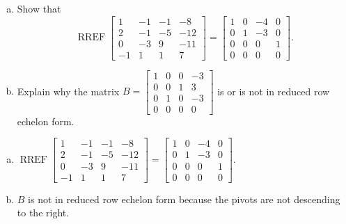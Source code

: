 
\begin{exerciseStatement}

\begin{enumerate}[(a)]
\item Show that \[\operatorname{RREF} \left[\begin{array}{cccc}
1 & -1 & -1 & -8 \\
2 & -1 & -5 & -12 \\
0 & -3 & 9 & -11 \\
-1 & 1 & 1 & 7
\end{array}\right] = \left[\begin{array}{cccc}
1 & 0 & -4 & 0 \\
0 & 1 & -3 & 0 \\
0 & 0 & 0 & 1 \\
0 & 0 & 0 & 0
\end{array}\right] .\]
\item Explain why the matrix \(B= \left[\begin{array}{cccc}
1 & 0 & 0 & -3 \\
0 & 0 & 1 & 3 \\
0 & 1 & 0 & -3 \\
0 & 0 & 0 & 0
\end{array}\right] \) is or is not in reduced row echelon form.
\end{enumerate}
    
\end{exerciseStatement}
    
\begin{exerciseAnswer} 

\begin{enumerate}[(a)]
\item \(\operatorname{RREF} \left[\begin{array}{cccc}
1 & -1 & -1 & -8 \\
2 & -1 & -5 & -12 \\
0 & -3 & 9 & -11 \\
-1 & 1 & 1 & 7
\end{array}\right] = \left[\begin{array}{cccc}
1 & 0 & -4 & 0 \\
0 & 1 & -3 & 0 \\
0 & 0 & 0 & 1 \\
0 & 0 & 0 & 0
\end{array}\right] .\)
\item \(B\) is not in reduced row echelon form because the pivots are not descending to the right. 
\end{enumerate}
    
\end{exerciseAnswer}
    
